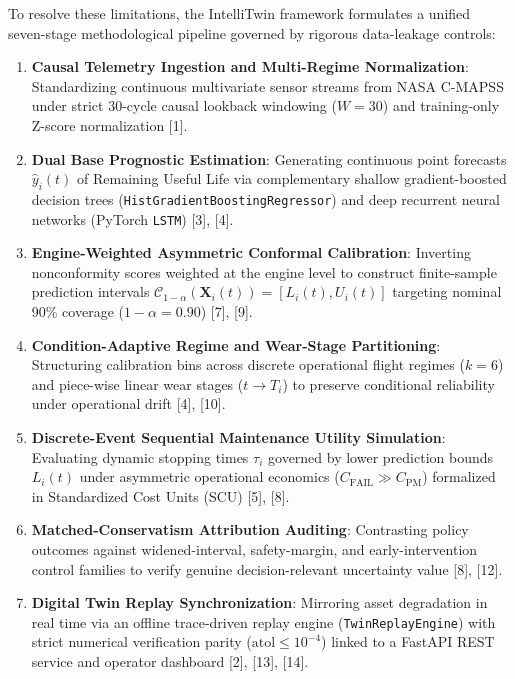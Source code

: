 \documentclass[12pt,a4paper]{article}
\begin{document}
To resolve these limitations, the IntelliTwin framework formulates a unified seven-stage methodological pipeline governed by rigorous data-leakage controls:
\begin{enumerate}
    \item \textbf{Causal Telemetry Ingestion and Multi-Regime Normalization}: Standardizing continuous multivariate sensor streams from NASA C-MAPSS under strict 30-cycle causal lookback windowing ($W = 30$) and training-only Z-score normalization [1].
    \item \textbf{Dual Base Prognostic Estimation}: Generating continuous point forecasts $\hat{y}_i(t)$ of Remaining Useful Life via complementary shallow gradient-boosted decision trees (\texttt{HistGradientBoostingRegressor}) and deep recurrent neural networks (PyTorch \texttt{LSTM}) [3], [4].
    \item \textbf{Engine-Weighted Asymmetric Conformal Calibration}: Inverting nonconformity scores weighted at the engine level to construct finite-sample prediction intervals $\mathcal{C}_{1-\alpha}(\mathbf{X}_i(t)) = [L_i(t), U_i(t)]$ targeting nominal 90\% coverage ($1 - \alpha = 0.90$) [7], [9].
    \item \textbf{Condition-Adaptive Regime and Wear-Stage Partitioning}: Structuring calibration bins across discrete operational flight regimes ($k = 6$) and piece-wise linear wear stages ($t \to T_i$) to preserve conditional reliability under operational drift [4], [10].
    \item \textbf{Discrete-Event Sequential Maintenance Utility Simulation}: Evaluating dynamic stopping times $\tau_i$ governed by lower prediction bounds $L_i(t)$ under asymmetric operational economics ($C_{\text{FAIL}} \gg C_{\text{PM}}$) formalized in Standardized Cost Units (SCU) [5], [8].
    \item \textbf{Matched-Conservatism Attribution Auditing}: Contrasting policy outcomes against widened-interval, safety-margin, and early-intervention control families to verify genuine decision-relevant uncertainty value [8], [12].
    \item \textbf{Digital Twin Replay Synchronization}: Mirroring asset degradation in real time via an offline trace-driven replay engine (\texttt{TwinReplayEngine}) with strict numerical verification parity ($\text{atol} \le 10^{-4}$) linked to a FastAPI REST service and operator dashboard [2], [13], [14].
\end{enumerate}
\end{document}
